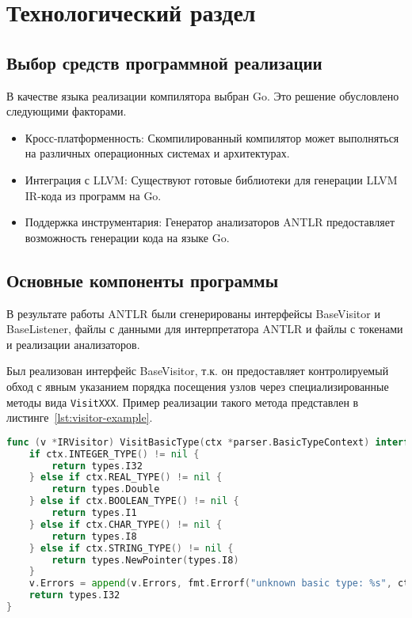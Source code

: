 \section{Технологический раздел}

\subsection{Выбор средств программной реализации}

В качестве языка реализации компилятора выбран Go. Это решение обусловлено следующими факторами.

\begin{itemize}
    \item Кросс-платформенность: Скомпилированный компилятор может выполняться на различных операционных системах и архитектурах.
    
    \item Интеграция с LLVM: Существуют готовые библиотеки для генерации LLVM IR-кода из программ на Go.
    
    \item Поддержка инструментария: Генератор анализаторов ANTLR предоставляет возможность генерации кода на языке Go.
\end{itemize}

\subsection{Основные компоненты программы}

В результате работы ANTLR были сгенерированы интерфейсы BaseVisitor и BaseListener, файлы с данными для интерпретатора ANTLR и файлы с токенами и реализации анализаторов.

Был реализован интерфейс BaseVisitor, т.к. он предоставляет контролируемый обход с явным указанием порядка посещения узлов через специализированные методы вида \texttt{VisitXXX}. Пример реализации такого метода представлен в листинге~\ref{lst:visitor-example}.

\begin{lstlisting}[language=go, caption={Пример реализации метода VisitBasicType для определения типа скалярной переменной}, label=lst:visitor-example]
func (v *IRVisitor) VisitBasicType(ctx *parser.BasicTypeContext) interface{} {
	if ctx.INTEGER_TYPE() != nil {
		return types.I32
	} else if ctx.REAL_TYPE() != nil {
		return types.Double
	} else if ctx.BOOLEAN_TYPE() != nil {
		return types.I1
	} else if ctx.CHAR_TYPE() != nil {
		return types.I8
	} else if ctx.STRING_TYPE() != nil {
		return types.NewPointer(types.I8)
	}
	v.Errors = append(v.Errors, fmt.Errorf("unknown basic type: %s", ctx.GetText()))
	return types.I32
}
\end{lstlisting}

